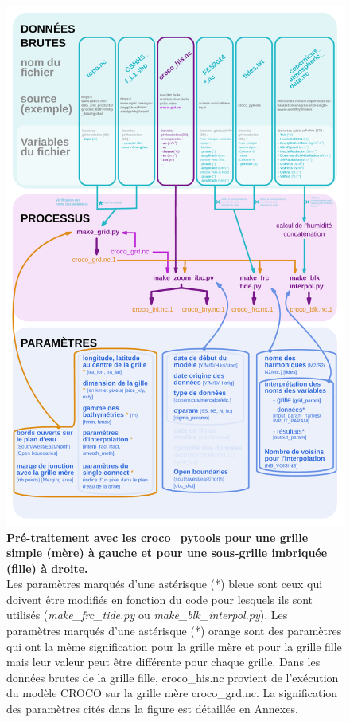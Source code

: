 \documentclass[10pt,a4paper,titlepage]{article}
\begin{document}
\begin{figure}[h]
\begin{center}
        \includegraphics[scale=0.35]{../images/workflow/graphe_data_process_fille_zoom.pdf}
        \caption{
            \textbf{Pré-traitement avec les croco\_pytools pour une grille simple ({\color{workColor}mère}) à gauche et pour une sous-grille imbriquée ({\color{orange}fille}) à droite.}
            \\Les paramètres marqués d'une {\color{paramColor}astérisque (*) bleue} sont ceux qui doivent être modifiés en fonction du code pour lesquels ils sont utilisés (\textit{make\_frc\_tide.py} ou \textit{make\_blk\_interpol.py}).
            Les paramètres marqués d'une {\color{orange}astérisque (*) orange} sont des paramètres qui ont la même signification pour la grille mère et pour la grille fille mais leur valeur peut être différente pour chaque grille.
            Dans les données brutes de la grille fille, {\color{outputColor}croco\_his.nc} provient de l'exécution du modèle CROCO sur la grille mère {\color{workColor}croco\_grd.nc}.
            La signification des paramètres cités dans la figure est détaillée en Annexes.
        }
        \label{fig:workflow_prepro_main}
    \end{center}
\end{figure}
\end{document}
